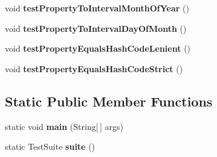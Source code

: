 \begin{DoxyCompactItemize}
\item 
\hypertarget{classorg_1_1joda_1_1time_1_1_test_date_midnight___properties_a03d4ce67005cb2a3f6d283e53a0010eb}{void {\bfseries test\-Property\-To\-Interval\-Month\-Of\-Year} ()}\label{classorg_1_1joda_1_1time_1_1_test_date_midnight___properties_a03d4ce67005cb2a3f6d283e53a0010eb}

\item 
\hypertarget{classorg_1_1joda_1_1time_1_1_test_date_midnight___properties_a649cf8e56731796d3b70651d09c59dfb}{void {\bfseries test\-Property\-To\-Interval\-Day\-Of\-Month} ()}\label{classorg_1_1joda_1_1time_1_1_test_date_midnight___properties_a649cf8e56731796d3b70651d09c59dfb}

\item 
\hypertarget{classorg_1_1joda_1_1time_1_1_test_date_midnight___properties_a1487af1109abc13af09c34f1dcac6831}{void {\bfseries test\-Property\-Equals\-Hash\-Code\-Lenient} ()}\label{classorg_1_1joda_1_1time_1_1_test_date_midnight___properties_a1487af1109abc13af09c34f1dcac6831}

\item 
\hypertarget{classorg_1_1joda_1_1time_1_1_test_date_midnight___properties_afde687433be30f820ecb430748a4e426}{void {\bfseries test\-Property\-Equals\-Hash\-Code\-Strict} ()}\label{classorg_1_1joda_1_1time_1_1_test_date_midnight___properties_afde687433be30f820ecb430748a4e426}

\end{DoxyCompactItemize}
\subsection*{Static Public Member Functions}
\begin{DoxyCompactItemize}
\item 
\hypertarget{classorg_1_1joda_1_1time_1_1_test_date_midnight___properties_af132b5d13b7afed020dcbb7a4aa9e5f6}{static void {\bfseries main} (String\mbox{[}$\,$\mbox{]} args)}\label{classorg_1_1joda_1_1time_1_1_test_date_midnight___properties_af132b5d13b7afed020dcbb7a4aa9e5f6}

\item 
\hypertarget{classorg_1_1joda_1_1time_1_1_test_date_midnight___properties_ad3c74829111b20b4bda646c32c52cd09}{static Test\-Suite {\bfseries suite} ()}\label{classorg_1_1joda_1_1time_1_1_test_date_midnight___properties_ad3c74829111b20b4bda646c32c52cd09}

\end{DoxyCompactItemize}
